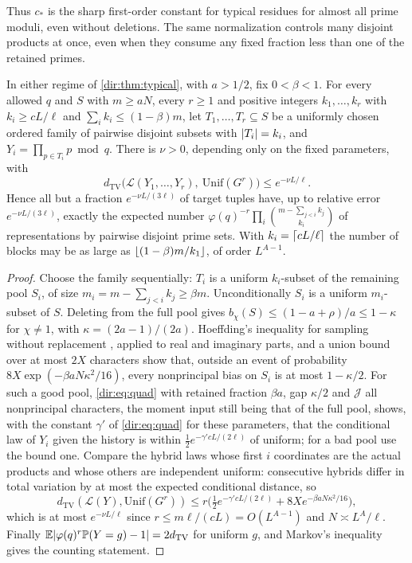 Thus $c_*$ is the sharp first-order constant for typical residues for almost all prime moduli, even
without deletions. The same normalization controls many disjoint products at once, even when they
consume any fixed fraction less than one of the retained primes.

\begin{theorem}\label{dir:thm:typicaljoint}
In either regime of \cref{dir:thm:typical}, with $a>1/2$, fix $0<\beta<1$. For every allowed $q$ and $S$
with $m\ge aN$, every $r\ge1$ and positive integers $k_1,\dots,k_r$ with $k_i\ge cL/\ell$ and
$\sum_ik_i\le(1-\beta)m$, let $T_1,\dots,T_r\subseteq S$ be a uniformly chosen ordered family of pairwise
disjoint subsets with $\lvert T_i\rvert=k_i$, and $Y_i=\prod_{p\in T_i}p\bmod q$. There is $\nu>0$, depending
only on the fixed parameters, with
\[
 d_{\mathrm{TV}}\bigl(\mathcal L(Y_1,\dots,Y_r),\ \mathrm{Unif}(G^r)\bigr)\le e^{-\nu L/\ell}.
\]
Hence all but a fraction $e^{-\nu L/(3\ell)}$ of target tuples have, up to relative error
$e^{-\nu L/(3\ell)}$, exactly the expected number
$\varphi(q)^{-r}\prod_i\binom{m-\sum_{j<i}k_j}{k_i}$ of representations by pairwise disjoint prime
sets. With $k_i=\lceil cL/\ell\rceil$ the number of blocks may be as large as $\lfloor(1-\beta)m/k_1\rfloor$, of
order $L^{A-1}$.
\end{theorem}

\begin{proof}
Choose the family sequentially: $T_i$ is a uniform $k_i$-subset of the remaining pool $S_i$, of size
$m_i=m-\sum_{j<i}k_j\ge\beta m$. Unconditionally $S_i$ is a uniform $m_i$-subset of $S$. Deleting from the
full pool gives $b_\chi(S)\le(1-a+\rho)/a\le1-\kappa$ for $\chi\ne1$, with $\kappa=(2a-1)/(2a)$. Hoeffding's
inequality for sampling without replacement \cite[\S6]{Hoeffding1963Probability}, applied to real and
imaginary parts, and a union bound over at most $2X$ characters show that, outside an event of
probability $8X\exp(-\beta aN\kappa^2/16)$, every nonprincipal bias on $S_i$ is at most $1-\kappa/2$. For
such a good pool, \eqref{dir:eq:quad} with retained fraction $\beta a$, gap $\kappa/2$ and $\mathcal J$ all
nonprincipal characters, the moment input still being that of the full pool, shows, with the constant
$\gamma'$ of \eqref{dir:eq:quad} for these parameters, that the conditional law of $Y_i$ given the history
is within $\tfrac12e^{-\gamma'cL/(2\ell)}$ of uniform; for a bad pool use
the bound one. Compare the hybrid laws whose first $i$ coordinates are the actual products and whose
others are independent uniform: consecutive hybrids differ in total variation by at most the expected
conditional distance, so
\[
 d_{\mathrm{TV}}(\mathcal L(Y),\mathrm{Unif}(G^r))\le r\bigl(\tfrac12e^{-\gamma'cL/(2\ell)}+8Xe^{-\beta aN\kappa^2/16}\bigr),
\]
which is at most $e^{-\nu L/\ell}$ since $r\le m\ell/(cL)=O(L^{A-1})$ and $N\asymp L^A/\ell$. Finally
$\mathbb{E}\lvert\varphi(q)^r\mathbb{P}(Y=g)-1\rvert=2d_{\mathrm{TV}}$ for uniform $g$, and Markov's inequality gives the
counting statement.
\end{proof}

